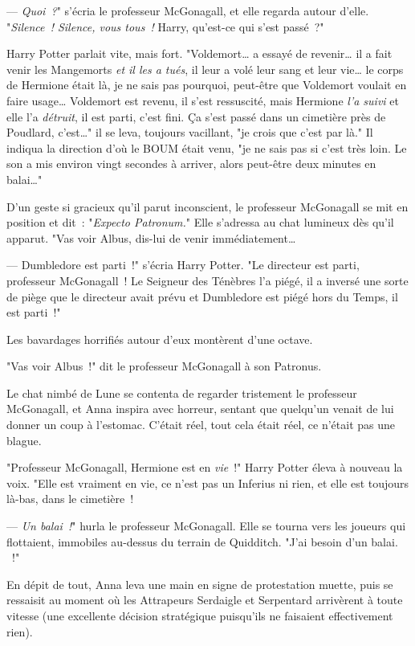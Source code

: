 --- \emph{Quoi~?}" s'écria le professeur McGonagall, et elle regarda autour d'elle. "\emph{Silence~! Silence, vous tous~!} Harry, qu'est-ce qui s'est passé~?"

Harry Potter parlait vite, mais fort. "Voldemort… a essayé de revenir… il a fait venir les Mangemorts \emph{et il les a tués}, il leur a volé leur sang et leur vie… le corps de Hermione était là, je ne sais pas pourquoi, peut-être que Voldemort voulait en faire usage… Voldemort est revenu, il s'est ressuscité, mais Hermione \emph{l'a suivi} et elle l'a \emph{détruit}, il est parti, c'est fini. Ça s'est passé dans un cimetière près de Poudlard, c'est…" il se leva, toujours vacillant, "je crois que c'est par là." Il indiqua la direction d'où le BOUM était venu, "je ne sais pas si c'est très loin. Le son a mis environ vingt secondes à arriver, alors peut-être deux minutes en balai…"

D'un geste si gracieux qu'il parut inconscient, le professeur McGonagall se mit en position et dit~: "\emph{Expecto Patronum.}" Elle s'adressa au chat lumineux dès qu'il apparut. "Vas voir Albus, dis-lui de venir immédiatement…

--- Dumbledore est parti~!" s'écria Harry Potter. "Le directeur est parti, professeur McGonagall~! Le Seigneur des Ténèbres l'a piégé, il a inversé une sorte de piège que le directeur avait prévu et Dumbledore est piégé hors du Temps, il est parti~!"

Les bavardages horrifiés autour d'eux montèrent d'une octave.

"Vas voir Albus~!" dit le professeur McGonagall à son Patronus.

Le chat nimbé de Lune se contenta de regarder tristement le professeur McGonagall, et Anna inspira avec horreur, sentant que quelqu'un venait de lui donner un coup à l'estomac. C'était réel, tout cela était réel, ce n'était pas une blague.

"Professeur McGonagall, Hermione est en \emph{vie}~!" Harry Potter éleva à nouveau la voix. "Elle est vraiment en vie, ce n'est pas un Inferius ni rien, et elle est toujours là-bas, dans le cimetière~!

--- \emph{Un balai~!}" hurla le professeur McGonagall. Elle se tourna vers les joueurs qui flottaient, immobiles au-dessus du terrain de Quidditch. "J'ai besoin d'un balai. ~!"

En dépit de tout, Anna leva une main en signe de protestation muette, puis se ressaisit au moment où les Attrapeurs Serdaigle et Serpentard arrivèrent à toute vitesse (une excellente décision stratégique puisqu'ils ne faisaient effectivement rien).

